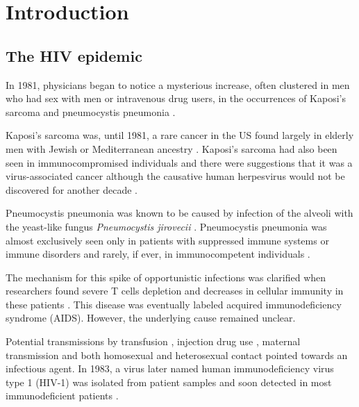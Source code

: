 \documentclass[../sherrill-Mix_thesis.tex]{subfiles}
\begin{document}
\graphicspath{{im/}{intro/im/}}
\chapter{Introduction}
\section{The HIV epidemic}
	In 1981, physicians began to notice a mysterious increase, often clustered in men who had sex with men or intravenous drug users, in the occurrences of Kaposi's sarcoma and pneumocystis pneumonia \citep{Gottlieb1981,Friedman-Kien1981,Hymes1981,Masur1981,Siegal1981,Gottlieb1981a}. 
	
	Kaposi's sarcoma was, until 1981, a rare cancer in the US found largely in elderly men with Jewish or Mediterranean ancestry \citep{Laor1979}. Kaposi's sarcoma had also been seen in immunocompromised individuals \citep{Klein1974,Myers1974,Kapadia1977} and there were suggestions that it was a virus-associated cancer \citep{Safai1981} although the causative human herpesvirus would not be discovered for another decade \citep{Chang1994,Sitas1999}. 
	
	Pneumocystis pneumonia was known to be caused by infection of the alveoli with the yeast-like fungus \emph{Pneumocystis jirovecii} \citep{Burke1973,Hughes1977}. Pneumocystis pneumonia was almost exclusively seen only in patients with suppressed immune systems or immune disorders and rarely, if ever, in immunocompetent individuals \citep{Hughes1977}. %

	The mechanism for this spike of opportunistic infections was clarified when researchers found severe T cells depletion and decreases in cellular immunity in these patients \citep{Masur1981,Siegal1981,Gottlieb1981a,Gerstoft1982,Masur1982}. This disease was eventually labeled acquired immunodeficiency syndrome (AIDS). However, the underlying cause remained unclear. 
	
	Potential transmissions by transfusion \citep{Ammann1982,Ehrenkranz1982,Poon1982}, injection drug use \citep{Masur1981,Masur1982,Greene1982}, maternal transmission \citep{OReilly1982} and both homosexual \citep{Fannin1982,Gerstoft1982} and heterosexual \citep{Masur1982,Harris1983} contact pointed towards an infectious agent. In 1983, a virus later named human immunodeficiency virus type 1 (HIV-1) was isolated from patient samples \citep{Barre-Sinoussi1983,Gallo1983,Popovic1984,Levy1984} and soon detected in most immunodeficient patients \citep{Gallo1984,Sarngadharan1984,Safai1984,Levy1984}. 
\end{document}
